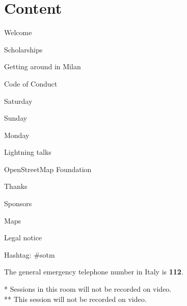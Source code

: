\section*{Content}

\vspace*{0.35em}%
\noindent Welcome\dotfill \pageref{welcome}

\vspace*{0.35em}%
\noindent Scholarships \dotfill \pageref{scholarships}

\vspace*{0.35em}%
\noindent Getting around in Milan \dotfill \pageref{getting-around}

\vspace*{0.35em}%
\noindent Code of Conduct \dotfill \pageref{coc}

\vspace*{0.35em}%
\noindent Saturday \dotfill \pageref{saturday}

\vspace*{0.35em}%
\noindent Sunday \dotfill \pageref{sunday}

\vspace*{0.35em}%
\noindent Monday \dotfill \pageref{monday}

\vspace*{0.35em}%
\noindent Lightning talks \dotfill \pageref{lightning-talks}

\vspace*{0.35em}%
\noindent OpenStreetMap Foundation \dotfill \pageref{osmf}

\vspace*{0.35em}%
\noindent Thanks \dotfill \pageref{thanks}

\vspace*{0.35em}%
\noindent Sponsors \dotfill \pageref{sponsors}

\vspace*{0.35em}%
\noindent Maps \dotfill \pageref{maps}

\vspace*{0.35em}%
\noindent Legal notice \dotfill \pageref{legal}

\vfill
\noindent
Hashtag: \#sotm

\vspace*{0.8em}%
\noindent
The general emergency telephone number in Italy is \textbf{112}.
\vfill

\noindent
\small{
  * Sessions in this room will not be recorded on video.\\
  ** This session will not be recorded on video.
}\normalsize


\newpage
